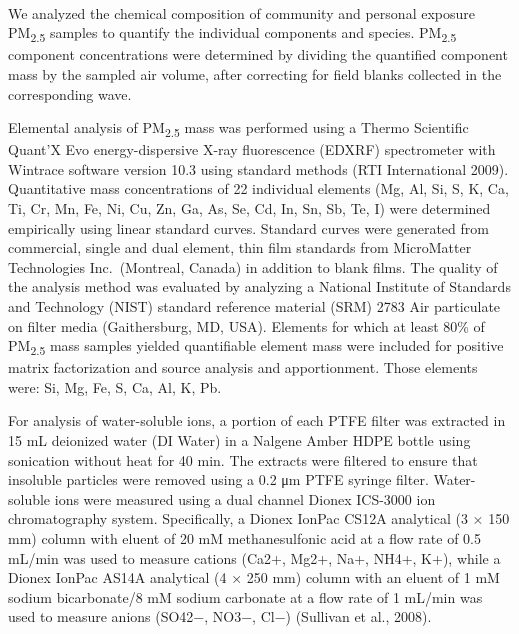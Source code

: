 \documentclass[
  letterpaper,
  DIV=11,
  numbers=noendperiod]{scrartcl}
\makeatletter
\let\oldparagraph\paragraph
\renewcommand{\paragraph}{ %
    \@ifstar %
      \xxxParagraphStar %
      \xxxParagraphNoStar %
  } %
\newcommand{\xxxParagraphStar}[1]{\oldparagraph*{#1}\mbox{}} %
\newcommand{\xxxParagraphNoStar}[1]{\oldparagraph{#1}\mbox{}} %
\providecommand{\DIFadd}[1]{{\protect\color{blue}\uwave{#1}}} %
\providecommand{\DIFaddbegin}{} %
\providecommand{\DIFaddend}{} %
\providecommand{\DIFdelbegin}{} %
\providecommand{\DIFdelend}{} %
\newcommand{\DIFscaledelfig}{0.5}
\newlength{\DIFdelgraphicswidth} %
\newlength{\DIFdelgraphicsheight} %
\newcommand{\DIFaddincludegraphics}[2][]{{\color{blue}\fbox{\DIFOincludegraphics[#1]{#2}}}} %
\newcommand{\DIFdelincludegraphics}[2][]{%
\sbox{\DIFdelgraphicsbox}{\DIFOincludegraphics[#1]{#2}}%
\settoboxwidth{\DIFdelgraphicswidth}{\DIFdelgraphicsbox} %
\settoboxtotalheight{\DIFdelgraphicsheight}{\DIFdelgraphicsbox} %
\scalebox{\DIFscaledelfig}{%
\parbox[b]{\DIFdelgraphicswidth}{\usebox{\DIFdelgraphicsbox}\\[-\baselineskip] \rule{\DIFdelgraphicswidth}{0em}}\llap{\resizebox{\DIFdelgraphicswidth}{\DIFdelgraphicsheight}{%
\setlength{\unitlength}{\DIFdelgraphicswidth}%
\begin{picture}(1,1)%
\thicklines\linethickness{2pt} %
{\color[rgb]{1,0,0}\put(0,0){\framebox(1,1){}}}%
{\color[rgb]{1,0,0}\put(0,0){\line( 1,1){1}}}%
{\color[rgb]{1,0,0}\put(0,1){\line(1,-1){1}}}%
\end{picture}%
}\hspace*{3pt}}} %
} %
\DeclareRobustCommand{\DIFaddbegin}{\DIFOaddbegin \let\includegraphics\DIFaddincludegraphics} %
\DeclareRobustCommand{\DIFaddend}{\DIFOaddend \let\includegraphics\DIFOincludegraphics} %
\DeclareRobustCommand{\DIFdelbegin}{\DIFOdelbegin \let\includegraphics\DIFdelincludegraphics} %
\DeclareRobustCommand{\DIFdelend}{\DIFOaddend \let\includegraphics\DIFOincludegraphics} %
\makeatother
\begin{document}
\DIFdelbegin %
\DIFdelend \DIFaddbegin \paragraph{\DIFadd{Chemical analysis of PM
mass}}\label{chemical-analysis-of-pm-mass}
\DIFaddend 

We analyzed the chemical composition of community and personal exposure
PM\textsubscript{2.5} samples to quantify the individual components and
species. PM\textsubscript{2.5} component concentrations were determined
by dividing the quantified component mass by the sampled air volume,
after correcting for field blanks collected in the corresponding wave.

Elemental analysis of PM\textsubscript{2.5} mass was performed using a
Thermo Scientific Quant'X Evo energy-dispersive X-ray fluorescence
(EDXRF) spectrometer with Wintrace software version 10.3 using standard
methods (RTI International 2009). Quantitative mass concentrations of 22
individual elements (Mg, Al, Si, S, K, Ca, Ti, Cr, Mn, Fe, Ni, Cu, Zn,
Ga, As, Se, Cd, In, Sn, Sb, Te, I) were determined empirically using
linear standard curves. Standard curves were generated from commercial,
single and dual element, thin film standards from MicroMatter
Technologies Inc.~(Montreal, Canada) in addition to blank films. The
quality of the analysis method was evaluated by analyzing a National
Institute of Standards and Technology (NIST) standard reference material
(SRM) 2783 Air particulate on filter media (Gaithersburg, MD, USA).
Elements for which at least 80\% of PM\textsubscript{2.5} mass samples
yielded quantifiable element mass were included for positive matrix
factorization and source analysis and apportionment. Those elements
were: Si, Mg, Fe, S, Ca, Al, K, Pb.

For analysis of water-soluble ions, a portion of each PTFE filter was
extracted in 15 mL deionized water (DI Water) in a Nalgene Amber HDPE
bottle using sonication without heat for 40 min. The extracts were
filtered to ensure that insoluble particles were removed using a 0.2 μm
PTFE syringe filter. Water-soluble ions were measured using a dual
channel Dionex ICS-3000 ion chromatography system. Specifically, a
Dionex IonPac CS12A analytical (3 × 150 mm) column with eluent of 20 mM
methanesulfonic acid at a flow rate of 0.5 mL/min was used to measure
cations (Ca2+, Mg2+, Na+, NH4+, K+), while a Dionex IonPac AS14A
analytical (4 × 250 mm) column with an eluent of 1 mM sodium
bicarbonate/8 mM sodium carbonate at a flow rate of 1 mL/min was used to
measure anions (SO42−, NO3−, Cl−) (Sullivan et al., 2008).
\end{document}
